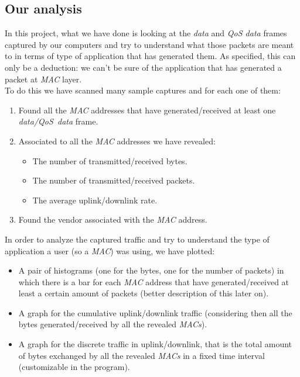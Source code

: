 \subsection{{Our analysis}}
    In this project, what we have done is looking at the \textit{data} and \textit{QoS data} frames captured by our computers and
    try to understand what those packets are meant to in terms of type of application that has generated them. As specified, this 
    can only be a deduction: we can't be sure of the application that has generated a packet at \textit{MAC} layer.\\ 
    To do this we have scanned many sample captures and for each one of them:
    \begin{enumerate}
        \item Found all the \textit{MAC} addresses that have generated/received at least one \textit{data/QoS\ data} frame.
        \item Associated to all the \textit{MAC} addresses we have revealed:
        \begin{itemize}
            \item The number of transmitted/received bytes.
            \item The number of transmitted/received packets.
            \item The average uplink/downlink rate.
        \end{itemize}
        \item Found the vendor associated with the \textit{MAC} address.
    \end{enumerate}
    In order to analyze the captured traffic and try to understand the type of application a user (so a \textit{MAC}) was using,
    we have plotted: 
    \begin{itemize}
        \item A pair of histograms (one for the bytes, one for the number of packets) in which there is a bar for each
                \textit{MAC} address that have generated/received at least a certain amount of packets (better description of
                this later on).
        \item A graph for the cumulative uplink/downlink traffic (considering then all the bytes generated/received by all the 
                revealed \textit{MACs}).
        \item A graph for the discrete traffic in uplink/downlink, that is the total amount of bytes exchanged by all the revealed
                \textit{MACs} in a fixed time interval (customizable in the program).
    \end{itemize}